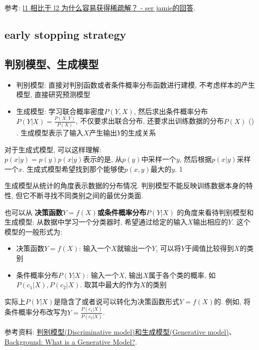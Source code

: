 \begin{flushright}
	
\end{flushright}参考: \href{https://www.zhihu.com/question/37096933/answer/475278057}{l1 相比于 l2 为什么容易获得稀疏解？ - ser jamie的回答}. 

\subsection{early stopping strategy}

\subsection{判别模型、生成模型}
\begin{itemize}
	\item 判别模型: 直接对判别函数或者条件概率分布函数进行建模, 不考虑样本的产生模型, 直接研究预测模型
	\item 生成模型: 学习联合概率密度$P(Y, X)$, 然后求出条件概率分布$P(Y|X) = \frac{P(X, Y)}{P(X)}$, 不仅要求出联合分布, 还要求出训练数据的分布$P(X)$ ({\color{red}{不一定要计算$p(X)$, 因为对于同一个样本, 计算它属于不同分类时, 其$p(X)$是一样的, 对判别没有帮助}}) . 生成模型表示了输入$X$产生输出$Y$的生成关系
\end{itemize}

对于生成式模型, 可以这样理解: \\
$p(x | y) = p(y)p(x | y)$表示的是, 从$p(y)$中采样一个$y$, 然后根据$p(x|y)$采样一个$x$. 生成式模型希望找到那个能够使$p(x, y)$最大的$y$. 1


生成模型从统计的角度表示数据的分布情况. 判别模型不能反映训练数据本身的特性, 但它不断寻找不同类别之间的最优分类面. 

也可以从 \textbf{决策函数$Y=f(X)$或条件概率分布$P(Y|X)$} 的角度来看待判别模型和生成模型: 
从数据中学习一个分类器时, 希望通过给定的输入$X$输出相应的$Y$. 这个模型的一般形式为: 
\begin{itemize}
	\item 决策函数$Y=f(X)$: 输入一个$X$就输出一个$Y$, 可以将$Y$于阈值比较得到$X$的类别
	\item 条件概率分布$P(Y|X)$: 输入一个$X$, 输出$X$属于各个类的概率, 如$P(c_1 | X), P(c_2 | X)$. 取其中最大的作为$X$的类别
\end{itemize}
实际上$P(Y|X)$是隐含了或者说可以转化为决策函数形式$Y=f(X)$的. 例如, 将条件概率分布改写为$Y = \frac{P(c_1 | X)}{P(c_2 | X) }$. 

参考资料: \href{https://blog.csdn.net/fishmemory/article/details/51711114}{判别模型(Discriminative model)和生成模型(Generative model)}、\href{https://developers.google.cn/machine-learning/gan/generative?hl=zh-cn}{Background: What is a Generative Model?}. 

